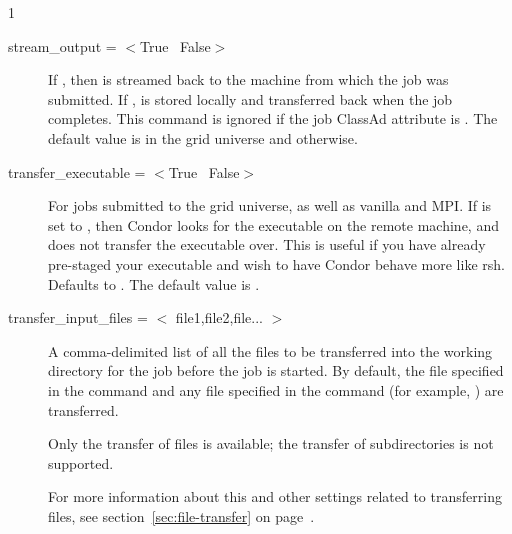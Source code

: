 \begin{ManPage}{\label{man-condor-submit}}{1}
\begin{description}
\item[stream\_output = $<$True \Bar\ False$>$]
If , then  is streamed back to
the machine from which the job was submitted.
If ,  is stored locally
and transferred back when the job completes.
This command is ignored if the job ClassAd attribute
 is
.
The default value is  in the grid
universe and  otherwise.


\item[transfer\_executable = $<$True \Bar\ False$>$]
For jobs submitted to the grid universe, as well as vanilla and MPI.
If  is set to
, then Condor looks for the executable on the remote machine, and
does not transfer the executable over.
This is useful if you have already pre-staged your
executable and wish to have Condor behave more like rsh.
Defaults to .
The default value is .


\item[transfer\_input\_files = $<$ file1,file2,file... $>$]
A comma-delimited list of all the files to be transferred into the
working directory for the job before the job is started.
By default, the file specified in the
 command and any file specified in the 
command (for example, ) are transferred.

Only the transfer of files is available; the transfer of
subdirectories is not supported.

For more information about this and other settings related to
transferring files, see section~\ref{sec:file-transfer} on
page~\pageref{sec:file-transfer}.



\end{description}
\end{ManPage}
